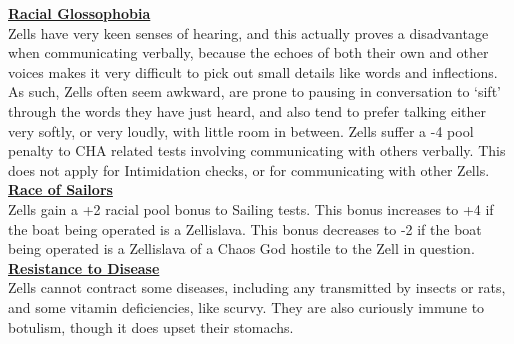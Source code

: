 \documentclass[a4paper, twocolumn, openany]{book}
\begin{document}
{	\underline{\bfseries Racial Glossophobia}\\
	Zells have very keen senses of hearing, and this actually proves a disadvantage when
	communicating verbally, because the echoes of both their own and other voices makes it very
	difficult to pick out small details like words and inflections. As such, Zells often seem awkward,
	are prone to pausing in conversation to ‘sift’ through the words they have just heard, and also
	tend to prefer talking either very softly, or very loudly, with little room in between. Zells suffer a
	-4 pool penalty to CHA related tests involving communicating with others verbally. This does not
	apply for Intimidation checks, or for communicating with other Zells.\\

	\underline{\bfseries Race of Sailors}\\
	Zells gain a +2 racial pool bonus to Sailing tests. This bonus increases to +4 if the boat being
	operated is a Zellislava. This bonus decreases to -2 if the boat being operated is a Zellislava of a
	Chaos God hostile to the Zell in question.\\

	\underline{\bfseries Resistance to Disease}\\
	Zells cannot contract some diseases, including any transmitted by insects or rats, and some
	vitamin deficiencies, like scurvy. They are also curiously immune to botulism, though it does
	upset their stomachs.\\

}
\end{document}
